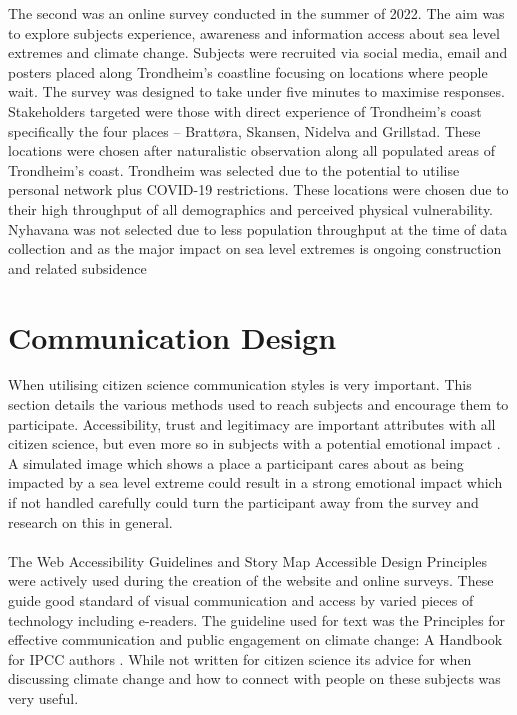 The second was an online survey conducted in the summer of 2022. The aim was to explore subjects experience, awareness and information access about sea level extremes and climate change. Subjects were recruited via social media, email and posters placed along Trondheim’s coastline focusing on locations where people wait. The survey was designed to take under five minutes to maximise responses. Stakeholders targeted were those with direct experience of Trondheim’s coast specifically the four places – Brattøra, Skansen, Nidelva and Grillstad. These locations were chosen after naturalistic observation along all populated areas of Trondheim’s coast. Trondheim was selected due to the potential to utilise personal network plus COVID-19 restrictions. These locations were chosen due to their high throughput of all demographics and perceived physical vulnerability. Nyhavana was not selected due to less population throughput at the time of data collection and as the major impact on sea level extremes is ongoing construction and related subsidence \cite{miljoenheten_og_byplankontoret_trondheim_kommune_9-notat-om-havnivastigning-og-stormflo---hensyn-i-arealplanlegging-nyhavnapdf_2020}




\section{Communication Design}

When utilising citizen science communication styles is very important. This section details the various methods used to reach subjects and encourage them to participate. Accessibility, trust and legitimacy are important attributes with all citizen science, but even more so in subjects with a potential emotional impact \cite{tweddle_guide_2012}. A simulated image which shows a place a participant cares about as being impacted by a sea level extreme could result in a strong emotional impact which if not handled carefully could turn the participant away from the survey and research on this in general.
\paragraph{}

The Web Accessibility Guidelines \cite{henry_web_2022} and Story Map Accessible Design Principles \cite{todd_liz_getting_nodate} were actively used during the creation of the website and online surveys. These guide good standard of visual communication and access by varied pieces of technology including e-readers. The guideline used for text  was the Principles for effective communication and public engagement on	climate change: A Handbook for IPCC authors \cite{corner_a_principles_2018}. While not written for citizen science its advice for when discussing climate change and how to connect with people on these subjects was very useful. 
